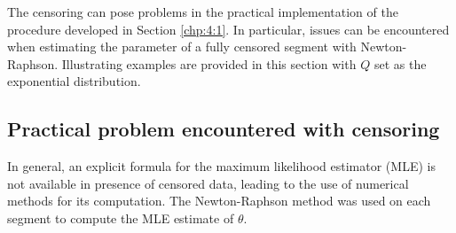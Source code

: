 The censoring can pose problems in the practical implementation of the procedure developed in Section \ref{chp:4:1}. In particular, issues can be encountered when estimating the parameter of a fully censored segment with Newton-Raphson. Illustrating examples are provided in this section with $Q$ set as the exponential distribution.

\subsection{Practical problem encountered with censoring}\label{chp:4:cens_seg}


In general, an explicit formula for the maximum likelihood estimator (MLE) is not available in presence of censored data, leading to the use of numerical methods for its computation. The Newton-Raphson method was used on each segment to compute the MLE estimate of $\theta$. 


